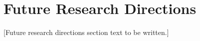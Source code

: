 
\section{Future Research Directions}
\label{sec:future}


[Future research directions section text to be written.]
